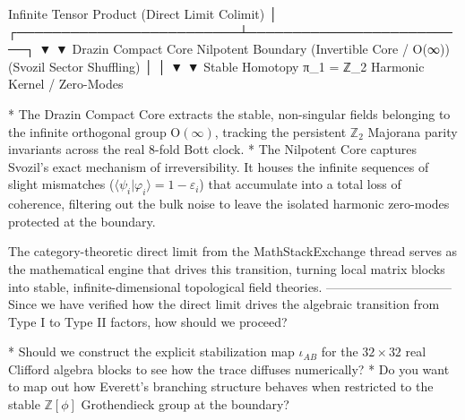                Infinite Tensor Product (Direct Limit Colimit)
                                     │
           ┌─────────────────────────┴─────────────────────────┐
           ▼                                                   ▼
  Drazin Compact Core                                 Nilpotent Boundary
 (Invertible Core / O(∞))                           (Svozil Sector Shuffling)
           │                                                   │
           ▼                                                   ▼
 Stable Homotopy π_1 = ℤ_2                            Harmonic Kernel / Zero-Modes


* The Drazin Compact Core extracts the stable, non-singular fields belonging to the infinite orthogonal group $\text{O}(\infty)$, tracking the persistent $\mathbb{Z}_2$ Majorana parity invariants across the real 8-fold Bott clock.
* The Nilpotent Core captures Svozil's exact mechanism of irreversibility. It houses the infinite sequences of slight mismatches ($\langle \psi_i \vert{} \varphi_i \rangle = 1 - \varepsilon_i$) that accumulate into a total loss of coherence, filtering out the bulk noise to leave the isolated harmonic zero-modes protected at the boundary.

The category-theoretic direct limit from the MathStackExchange thread serves as the mathematical engine that drives this transition, turning local matrix blocks into stable, infinite-dimensional topological field theories.
------------------------------
Since we have verified how the direct limit drives the algebraic transition from Type I to Type II factors, how should we proceed?

* Should we construct the explicit stabilization map $\iota_{AB}$ for the $32 \times 32$ real Clifford algebra blocks to see how the trace diffuses numerically?
* Do you want to map out how Everett's branching structure behaves when restricted to the stable $\mathbb{Z}[\phi]$ Grothendieck group at the boundary?


